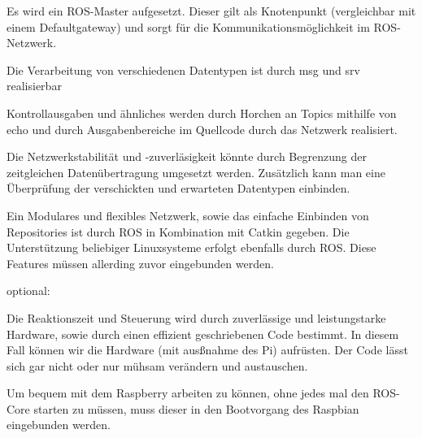 \documentclass[12pt]{article}
\begin{document}
Es wird ein ROS-Master aufgesetzt. Dieser gilt als Knotenpunkt (vergleichbar mit einem Defaultgateway) und sorgt für die Kommunikationsmöglichkeit im ROS-Netzwerk.

Die Verarbeitung von verschiedenen Datentypen ist durch msg und srv realisierbar

Kontrollausgaben und ähnliches werden durch Horchen an Topics mithilfe von echo und durch Ausgabenbereiche im Quellcode durch das Netzwerk realisiert.
 

Die Netzwerkstabilität und -zuverläsigkeit könnte durch Begrenzung der zeitgleichen Datenübertragung umgesetzt werden. Zusätzlich kann man eine Überprüfung der verschickten und erwarteten Datentypen einbinden.


Ein Modulares und flexibles Netzwerk, sowie das einfache Einbinden von Repositories ist durch ROS in Kombination mit Catkin gegeben. Die Unterstützung beliebiger Linuxsysteme erfolgt ebenfalls durch ROS. Diese Features müssen allerding zuvor eingebunden werden.


optional:

Die Reaktionszeit 
und Steuerung %
wird durch zuverlässige und leistungstarke Hardware, sowie durch einen effizient geschriebenen Code bestimmt. In diesem Fall können wir die Hardware (mit ausßnahme des Pi) aufrüsten. Der Code lässt sich gar nicht oder nur mühsam verändern und austauschen.


Um bequem mit dem Raspberry arbeiten zu können, ohne jedes mal den ROS-Core starten zu müssen, muss dieser in den Bootvorgang des Raspbian eingebunden werden.



\end{document}
